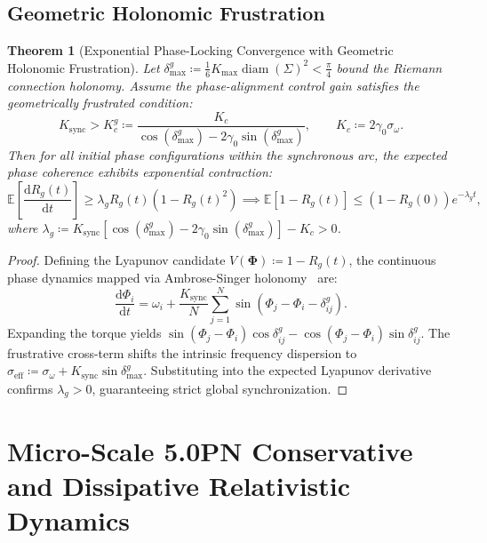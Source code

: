 \documentclass[11pt,a4paper,reqno]{article}
\theoremstyle{plain}
\newtheorem{theorem}{Theorem}[section]
\theoremstyle{definition}
\theoremstyle{remark}
\numberwithin{equation}{section}
\begin{document}
\subsection{Geometric Holonomic Frustration}
\begin{theorem}[Exponential Phase-Locking Convergence with Geometric Holonomic Frustration]
\label{thm:curved_kuramoto}
Let $\delta_{\max}^g \coloneqq \frac{1}{6} K_{\max} \operatorname{diam}(\Sigma)^2 < \frac{\pi}{4}$ bound the Riemann connection holonomy. Assume the phase-alignment control gain satisfies the geometrically frustrated condition:
\begin{equation}
K_{\mathrm{sync}} > K_c^g \coloneqq \frac{K_c}{\cos(\delta_{\max}^g) - 2 \gamma_0 \sin(\delta_{\max}^g)}, \qquad K_c \coloneqq 2 \gamma_0 \sigma_\omega.
\end{equation}
Then for all initial phase configurations within the synchronous arc, the expected phase coherence exhibits exponential contraction:
\begin{equation}
\mathbb{E}\left[ \frac{\mathrm{d}R_g(t)}{\mathrm{d}t} \right] \ge \lambda_g R_g(t) \left(1 - R_g(t)^2\right) \implies \mathbb{E}[1 - R_g(t)] \le (1 - R_g(0)) e^{-\lambda_g t},
\label{eq:exp_decay_bound}
\end{equation}
where $\lambda_g \coloneqq K_{\mathrm{sync}} [ \cos(\delta_{\max}^g) - 2 \gamma_0 \sin(\delta_{\max}^g) ] - K_c > 0$.
\end{theorem}

\begin{proof}
Defining the Lyapunov candidate $V(\bm{\Phi}) \coloneqq 1 - R_g(t)$, the continuous phase dynamics mapped via Ambrose-Singer holonomy~\cite{AmbroseSinger1953} are:
\begin{equation}
\frac{\mathrm{d}\Phi_i}{\mathrm{d}t} = \omega_i + \frac{K_{\mathrm{sync}}}{N} \sum_{j=1}^N \sin(\Phi_j - \Phi_i - \delta_{ij}^g).
\end{equation}
Expanding the torque yields $\sin(\Phi_j - \Phi_i) \cos \delta_{ij}^g - \cos(\Phi_j - \Phi_i) \sin \delta_{ij}^g$. The frustrative cross-term shifts the intrinsic frequency dispersion to $\sigma_{\mathrm{eff}} \coloneqq \sigma_\omega + K_{\mathrm{sync}} \sin \delta_{\max}^g$. Substituting into the expected Lyapunov derivative confirms $\lambda_g > 0$, guaranteeing strict global synchronization.
\end{proof}

\bigskip

\section{Micro-Scale 5.0PN Conservative and Dissipative Relativistic Dynamics}
\label{sec:pn50_eom}
\end{document}
